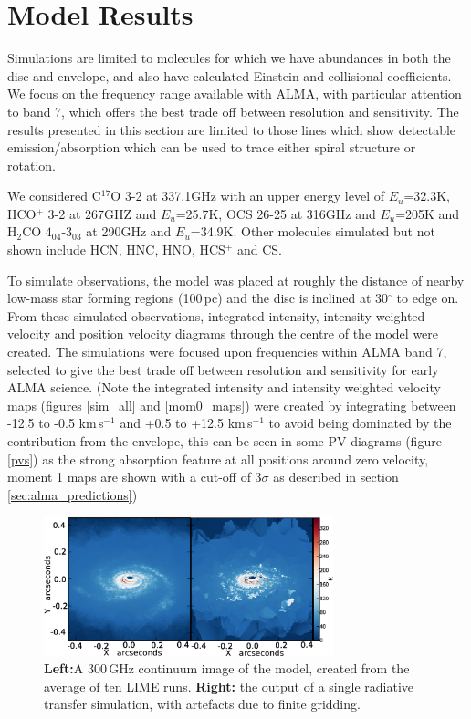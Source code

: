 \documentclass[useAMS,usenatbib]{mn2e}
\begin{document}
\section{Model Results} \label{sec:model_results}

Simulations are limited to molecules for which we have abundances in both the disc and envelope, and also have calculated Einstein and collisional coefficients. We focus on the frequency range available with ALMA, with particular attention to band 7, which offers the best trade off between resolution and sensitivity. The results presented in this section are limited to those lines which show detectable emission/absorption which can be used to trace either spiral structure or rotation.\newline

We considered C$^{17}$O 3-2 at 337.1GHz with an upper energy level of $E_u$=32.3K, HCO$^+$ 3-2 at 267GHZ and $E_u$=25.7K, OCS 26-25 at 316GHz and $E_u$=205K and H$_2$CO $4_{04}$-3$_{03}$ at 290GHz and $E_u$=34.9K. Other molecules simulated but not shown include HCN, HNC, HNO, HCS$^+$ and CS.\newline

To simulate observations, the model was placed at roughly the distance of nearby low-mass star forming regions (100$\,$pc) and the disc is inclined at 30$^\circ$ to edge on. From these simulated observations, integrated intensity, intensity weighted velocity and position velocity diagrams through the centre of the model were created.
The simulations were focused upon frequencies within ALMA band 7, selected to give the best trade off between resolution and sensitivity for early ALMA science.
(Note the integrated intensity and intensity weighted velocity maps (figures \ref{sim_all} and \ref{mom0_maps}) were created by integrating between -12.5 to -0.5 km$\,$s$^{-1}$ and +0.5 to +12.5 km$\,$s$^{-1}$ to avoid being dominated by the contribution from the envelope, this can be seen in some PV diagrams  (figure \ref{pvs}) as the strong absorption feature at all positions around zero velocity, moment 1 maps are shown with a cut-off of 3$\sigma$ as described in section \ref{sec:alma_predictions})\newline

\begin{figure}
 \includegraphics[width=84mm]{Figures/sim/continuum.eps}
 \caption{{\bf Left:}A 300$\,$GHz continuum image of the model, created from the average of ten LIME runs. {\bf Right:} the output of a single radiative transfer simulation, with artefacts due to finite gridding.}
 \label{averages}
\end{figure}
\end{document}
